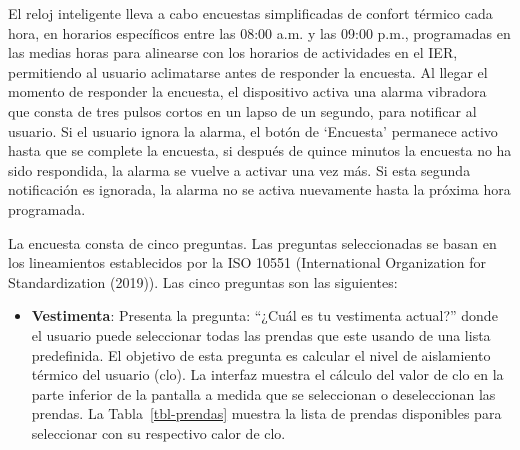 \documentclass[
  12pt,
  letterpaper,
  DIV=11,
  numbers=noendperiod]{scrreport}
\providecommand{\tightlist}{%
  \setlength{\itemsep}{0pt}\setlength{\parskip}{0pt}}\usepackage{longtable,booktabs,array}
\begin{document}
El reloj inteligente lleva a cabo encuestas simplificadas de confort
térmico cada hora, en horarios específicos entre las 08:00 a.m. y las
09:00 p.m., programadas en las medias horas para alinearse con los
horarios de actividades en el IER, permitiendo al usuario aclimatarse
antes de responder la encuesta. Al llegar el momento de responder la
encuesta, el dispositivo activa una alarma vibradora que consta de tres
pulsos cortos en un lapso de un segundo, para notificar al usuario. Si
el usuario ignora la alarma, el botón de `Encuesta' permanece activo
hasta que se complete la encuesta, si después de quince minutos la
encuesta no ha sido respondida, la alarma se vuelve a activar una vez
más. Si esta segunda notificación es ignorada, la alarma no se activa
nuevamente hasta la próxima hora programada.

La encuesta consta de cinco preguntas. Las preguntas seleccionadas se
basan en los lineamientos establecidos por la ISO 10551 (International
Organization for Standardization (2019)). Las cinco preguntas son las
siguientes:

\begin{itemize}
\tightlist
\item
  \textbf{Vestimenta}: Presenta la pregunta: ``¿Cuál es tu vestimenta
  actual?'' donde el usuario puede seleccionar todas las prendas que
  este usando de una lista predefinida. El objetivo de esta pregunta es
  calcular el nivel de aislamiento térmico del usuario (clo). La
  interfaz muestra el cálculo del valor de clo en la parte inferior de
  la pantalla a medida que se seleccionan o deseleccionan las prendas.
  La Tabla~\ref{tbl-prendas} muestra la lista de prendas disponibles
  para seleccionar con su respectivo calor de clo.
\end{itemize}
\end{document}
